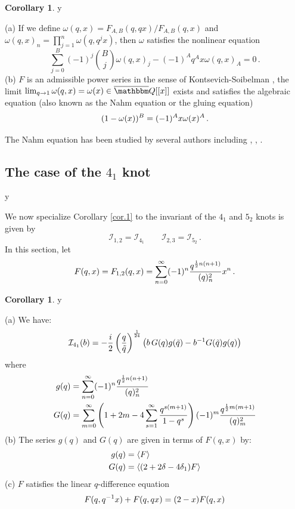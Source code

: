 \documentclass[12pt]{amsart}
\theoremstyle{definition}
\newtheorem{corollary}[theorem]{Corollary}
\def\printname#1{
        \if\draft y
                \smash{\makebox[0pt]{\hspace{-0.5in}
                        \raisebox{8pt}{\tt\tiny #1}}}
        \fi
}
\def\lbl#1{\label{#1}\printname{#1}}
\def\BQ{\mathbbm Q}
\def\calI{\mathcal I}
\def\la{\langle}
\def\ra{\rangle}
\def\tq{\tilde{q}}
\def\d{\delta}
\begin{document}
\begin{corollary}
\lbl{cor.omega}
\rm{(a)} If we define $\omega(q,x)=F_{A,B}(q,qx)/F_{A,B}(q,x)$ 
and $\omega(q,x)_n=
\prod_{j=1}^n \omega(q,q^jx)$, then $\omega$ satisfies the
nonlinear equation 
$$
\sum_{j=0}^B (-1)^j \binom{B}{j} \omega(q,x)_j -(-1)^A q^A x \omega(q,x)_A=0
\,.
$$
\rm{(b)} $F$ is an admissible power series in the sense of 
Kontsevich-Soibelman \cite[Sec.6]{KS}, the limit 
$\lim_{q\to 1} \omega(q,x)=\omega(x) \in \overline\BQ[[x]]$ 
exists and satisfies the 
algebraic equation (also known as the Nahm equation or the gluing equation) 
\begin{equation}
\lbl{eq.FABnahm}
(1-\omega(x))^B = (-1)^A x \omega(x)^A \,.
\end{equation}
\end{corollary}
The Nahm equation has been studied by several authors including
\cite[Sec.3]{Za:DL}, \cite{Vlasenko,VZ}, \cite[Sec.4]{R-V}.

\subsection{The case of the $4_1$ knot}
\lbl{sub.41}

We now specialize Corollary \ref{cor.1} to the invariant of the 
$4_1$ and $5_2$ knots is given by \cite{KLV,AK} 
$$
\calI_{1,2}=\calI_{4_1} \qquad \calI_{2,3}=\calI_{5_2} \,.
$$
In this section, let 
\begin{equation}
\lbl{eq.Fqx}
F(q,x)=F_{1,2}(q,x)= \sum_{n=0}^\infty 
(-1)^n \frac{q^{\frac{1}{2} n(n+1)}}{(q)_n^2} x^n \,.
\end{equation}

\begin{corollary}
\lbl{cor.41}
\rm{(a)} We have:
\begin{equation}
\lbl{eq.prop1}
\calI_{4_1}(b) = -\frac{i}{2} \left(\frac{q}{\tq}\right)^{\frac{1}{24}}
\left( b \, G(q) g(\tq) - b^{-1} G(\tq) g(q) \right)
\end{equation}
where
\begin{subequations}
\begin{align}
\lbl{eq.g}
g(q) &= \sum_{n=0}^\infty (-1)^n \frac{q^{\frac{1}{2} n(n+1)}}{(q)_n^2}
\\
\lbl{eq.G}
G(q) &=\sum_{m=0}^\infty \left(1 + 2m -4 
\sum_{s=1}^\infty \frac{q^{s(m+1)}}{1-q^s} \right) 
(-1)^m \frac{q^{\frac{1}{2} m(m+1)}}{(q)_m^2}
\end{align}
\end{subequations}
\rm{(b)} The series $g(q)$ and $G(q)$ are given in terms of $F(q,x)$
by:
\begin{subequations}
\begin{align}
\lbl{eq.gF}
g(q) &= \la F \ra \\
\lbl{eq.GF}
G(q) &= \la (2 + 2 \d -4 \d_1)F \ra
\end{align}
\end{subequations}
\rm{(c)} $F$ satisfies the linear $q$-difference equation
\begin{equation}
\lbl{eq.Frec}
F(q,q^{-1}x)+F(q,qx)=(2-x) F(q,x)
\end{equation}
\end{corollary}
\end{document}
